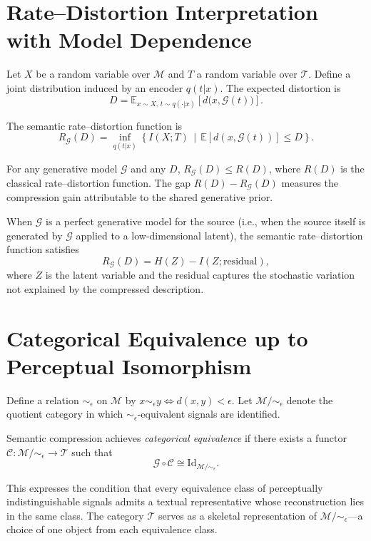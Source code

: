 \documentclass[12pt,a4paper]{article}
\theoremstyle{definition}
\theoremstyle{remark}
\begin{document}
\section{Rate--Distortion Interpretation with Model Dependence}
\label{app:ratedistortion}

Let $X$ be a random variable over $\mathcal{M}$ and $T$ a random variable over $\mathcal{T}$. Define a joint distribution induced by an encoder $q(t|x)$. The expected distortion is
\[
D = \mathbb{E}_{x \sim X, \, t \sim q(\cdot|x)} \left[ d\big(x, \mathcal{G}(t)\big) \right].
\]

The semantic rate--distortion function is
\[
R_{\mathcal{G}}(D) = \inf_{q(t|x)} \left\{ I(X;T) \,\middle|\, \mathbb{E}[d(x,\mathcal{G}(t))] \le D \right\}.
\]

For any generative model $\mathcal{G}$ and any $D$, $R_{\mathcal{G}}(D) \le R(D)$, where $R(D)$ is the classical rate--distortion function. The gap $R(D) - R_{\mathcal{G}}(D)$ measures the compression gain attributable to the shared generative prior.

When $\mathcal{G}$ is a perfect generative model for the source (i.e., when the source itself is generated by $\mathcal{G}$ applied to a low-dimensional latent), the semantic rate--distortion function satisfies
\[
R_{\mathcal{G}}(D) = H(Z) - I(Z; \text{residual}),
\]
where $Z$ is the latent variable and the residual captures the stochastic variation not explained by the compressed description.

\section{Categorical Equivalence up to Perceptual Isomorphism}
\label{app:equivalence}

Define a relation $\sim_\epsilon$ on $\mathcal{M}$ by $x \sim_\epsilon y \iff d(x,y) < \epsilon$. Let $\mathcal{M}/\!\sim_\epsilon$ denote the quotient category in which $\sim_\epsilon$-equivalent signals are identified.

Semantic compression achieves \emph{categorical equivalence} if there exists a functor $\mathcal{C} : \mathcal{M}/\!\sim_\epsilon \rightarrow \mathcal{T}$ such that
\[
\mathcal{G} \circ \mathcal{C} \cong \mathrm{Id}_{\mathcal{M}/\!\sim_\epsilon}.
\]

This expresses the condition that every equivalence class of perceptually indistinguishable signals admits a textual representative whose reconstruction lies in the same class. The category $\mathcal{T}$ serves as a skeletal representation of $\mathcal{M}/\!\sim_\epsilon$---a choice of one object from each equivalence class.
\end{document}
